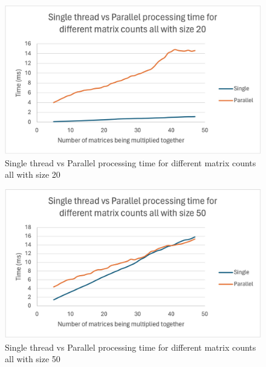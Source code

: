 \begin{figure}[H]
    \centering
    \includegraphics[width=1\columnwidth]{Figures/different_matrix_counts_size_20}
    \caption{Single thread vs Parallel processing time for different matrix counts all with size 20}
    \label{fig:different_matrix_counts_size 20}
\end{figure}

\begin{figure}[H]
    \centering
    \includegraphics[width=1\columnwidth]{Figures/different_matrix_counts_size_50}
    \caption{Single thread vs Parallel processing time for different matrix counts all with size 50}
    \label{fig:different_matrix_counts_size 50}
\end{figure}

